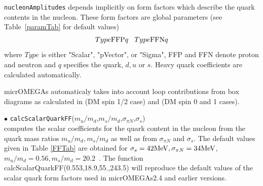 \documentclass[12pt,a4paper]{article}
\begin{document}
\verb|nucleonAmplitudes| depends implicitly on form factors which describe the 
quark contents in the nucleon. These form factors are global parameters (see
Table~\ref{paramTab} for
default values)
\begin{equation}
Type{\rm FFP}q \;\;\; Type{\rm FFN}q \nonumber
\end{equation} 
where $Type$ is either "Scalar", "pVector", or "Sigma",  FFP and FFN denote proton and neutron  and
$q$ specifies the quark, $d,u$  or $s$. Heavy quark coefficients are calculated automatically.

micrOMEGAs automaticaly takes into account loop contributions  from box
diagrams as calculated in \cite{Drees:1993bu} (DM spin 1/2 case) and \cite{Hisano:2015bma}
(DM spin 0 and 1 cases).

\noindent$\bullet$
{\tt calcScalarQuarkFF}($m_u/m_d$,$m_s/m_d$,$\sigma_{\pi N}$,$\sigma_s$)\\
computes the scalar coefficients for the quark content in the nucleon from the quark mass ratios
$m_u/m_d, m_s/m_d$ as well as from $\sigma_{\pi N}$ and $\sigma_s$.
The default values given in Table  \ref{FFTab} are obtained for 
$\sigma_s=42{\rm MeV},\sigma_{\pi N}=34{\rm MeV}$, $m_u/m_d=0.56, m_s/m_d=20.2$~\cite{Beringer:1900zz}.
The function calcScalarQuarkFF(0.553,18.9,55.,243.5)  will reproduce   the default values of the  scalar quark
form factors used in micrOMEGAs2.4 and earlier  versions.
\end{document}
